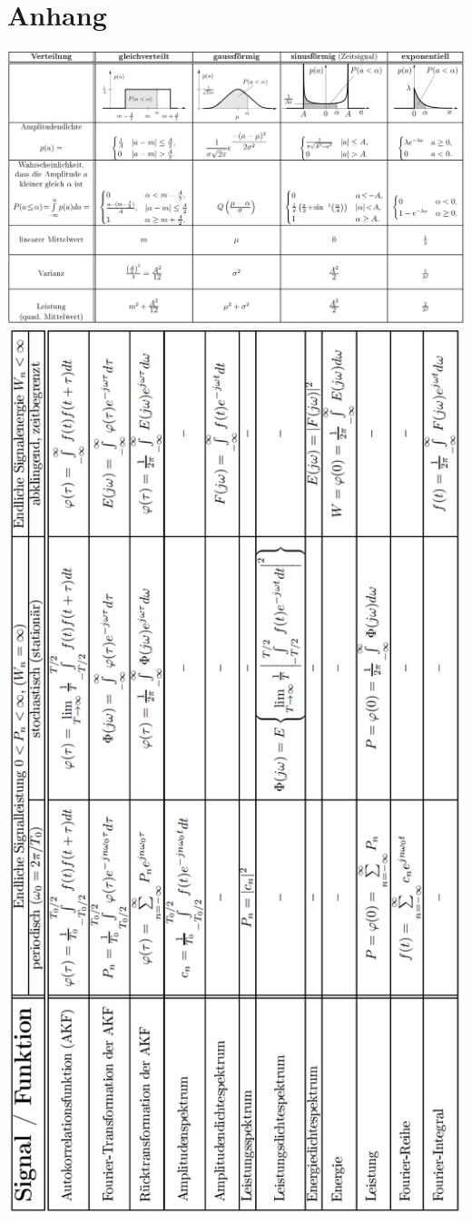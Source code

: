 \documentclass[margin=normal]{tex/hsrzf}
\begin{document}
\section{Anhang}

\includegraphics{img/Tabelle_Dichtefunktionen.png}
\includegraphics{img/Tabelle_Signale und Funktion.png}
\end{document}
